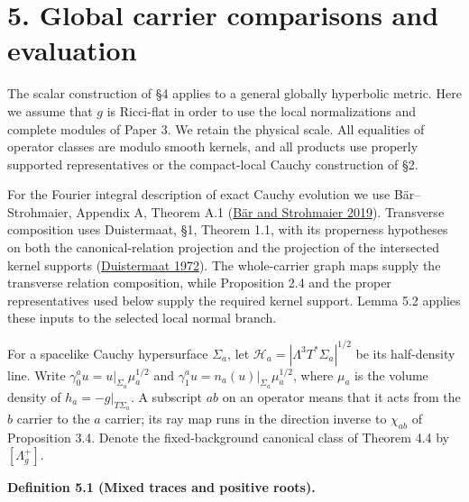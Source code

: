 \documentclass[
  english,
  11pt,
  reqno]{amsart}
\makeatletter
\newcommand{\pandocstatementheading}[1]{%
  \par\if@nobreak\else
    \addpenalty{\@beginparpenalty}%
    \addvspace{.5\baselineskip plus .2\baselineskip minus .2\baselineskip}%
  \fi
  {\normalfont\bfseries #1\par}%
  \nobreak\@afterindenttrue\@afterheading
}
\makeatother
\begin{document}
\section{5. Global carrier comparisons and
evaluation}\label{global-carrier-comparisons-and-evaluation}

The scalar construction of §4 applies to a general globally hyperbolic
metric. Here we assume that \(g\) is Ricci-flat in order to use the
local normalizations and complete modules of Paper 3. We retain the
physical scale. All equalities of operator classes are modulo smooth
kernels, and all products use properly supported representatives or the
compact-local Cauchy construction of §2.

For the Fourier integral description of exact Cauchy evolution we use
Bär--Strohmaier, Appendix A, Theorem A.1
(\hyperref[ref-BarStrohmaier2019]{Bär and Strohmaier 2019}). Transverse
composition uses Duistermaat, §1, Theorem 1.1, with its properness
hypotheses on both the canonical-relation projection and the projection
of the intersected kernel supports
(\hyperref[ref-Duistermaat1972]{Duistermaat 1972}). The whole-carrier
graph maps supply the transverse relation composition, while Proposition
2.4 and the proper representatives used below supply the required kernel
support. Lemma 5.2 applies these inputs to the selected local normal
branch.

For a spacelike Cauchy hypersurface \(\Sigma_a\), let
\(\mathcal H_a=|\Lambda^3T^*\Sigma_a|^{1/2}\) be its half-density line.
Write \(\gamma_0^a u=u|_{\Sigma_a}\mu_a^{1/2}\) and
\(\gamma_1^a u=n_a(u)|_{\Sigma_a}\mu_a^{1/2}\), where \(\mu_a\) is the
volume density of \(h_a=-g|_{T\Sigma_a}\). A subscript \(ab\) on an
operator means that it acts from the \(b\) carrier to the \(a\) carrier;
its ray map runs in the direction inverse to \(\chi_{ab}\) of
Proposition 3.4. Denote the fixed-background canonical class of Theorem
4.4 by \([\Lambda_g^+]\).

\pandocstatementheading{\protect{}\label{def:global-mixed-carrier-traces}Definition 5.1 (Mixed traces and positive roots).}
\end{document}

